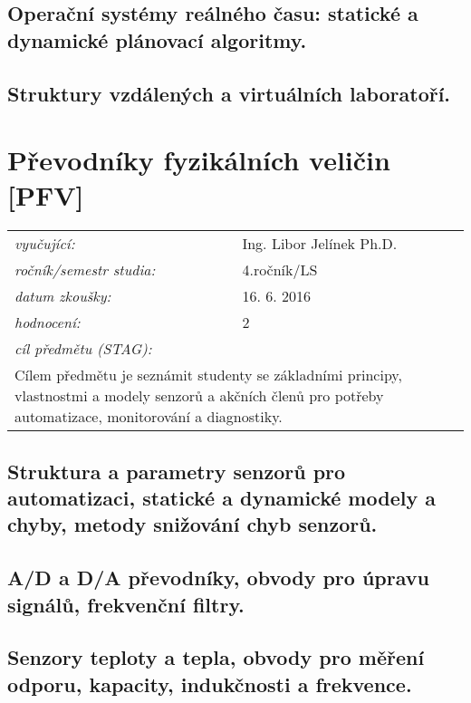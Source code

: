 \subsection{Operační systémy reálného času: statické a dynamické plánovací algoritmy.}

\subsection{Struktury vzdálených a virtuálních laboratoří.}

\newpage
\section{Převodníky fyzikálních veličin [PFV]}

\begin{table}[H]
\centering
\begin{tabular}{p{4cm} p{12cm}}
\textit{vyučující:}             & Ing. Libor Jelínek Ph.D. \\
\textit{ročník/semestr studia:} & 4.ročník/LS \\
\textit{datum zkoušky:}         & 16. 6. 2016 \\
\textit{hodnocení:}             & 2 \\
\textit{cíl předmětu (STAG):}   & \\
\multicolumn{2}{p{16cm}}{Cílem předmětu je seznámit studenty se základními principy, vlastnostmi a modely senzorů a akčních členů pro potřeby automatizace, monitorování a diagnostiky.}
\end{tabular}
\end{table}

\subsection{Struktura a parametry senzorů pro automatizaci, statické a dynamické modely a chyby, metody snižování chyb senzorů.}

\subsection{A/D a D/A převodníky, obvody pro úpravu signálů, frekvenční filtry.}

\subsection{Senzory teploty a tepla, obvody pro měření odporu, kapacity, indukčnosti a frekvence.}

